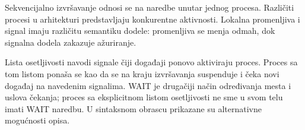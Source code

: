 Sekvencijalno izvršavanje odnosi se na naredbe unutar jednog procesa. Različiti procesi u arhitekturi predstavljaju konkurentne aktivnosti. Lokalna promenljiva i signal imaju različitu semantiku dodele: promenljiva se menja odmah, dok signalna dodela zakazuje ažuriranje.

Lista osetljivosti navodi signale čiji događaji ponovo aktiviraju proces. Proces sa tom listom ponaša se kao da se na kraju izvršavanja suspenduje i čeka novi događaj na navedenim signalima. WAIT je drugačiji način određivanja mesta i uslova čekanja; proces sa eksplicitnom listom osetljivosti ne sme u svom telu imati WAIT naredbu. U sintaksnom obrascu prikazane su alternativne mogućnosti opisa.

